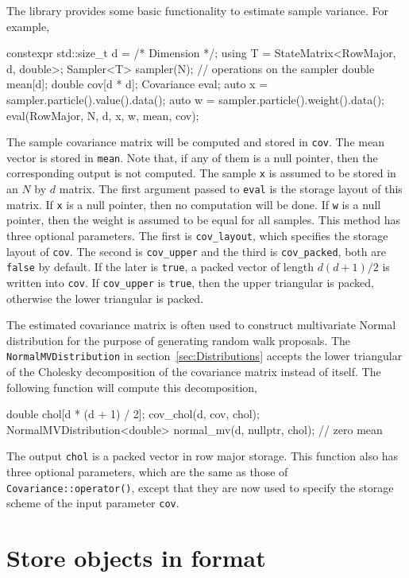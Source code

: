 The library provides some basic functionality to estimate sample variance. For
example,
\begin{cppcode}
  constexpr std::size_t d = /* Dimension */;
  using T = StateMatrix<RowMajor, d, double>;
  Sampler<T> sampler(N);
  // operations on the sampler
  double mean[d];
  double cov[d * d];
  Covariance eval;
  auto x = sampler.particle().value().data();
  auto w = sampler.particle().weight().data();
  eval(RowMajor, N, d, x, w, mean, cov);
\end{cppcode}
The sample covariance matrix will be computed and stored in \verb|cov|. The
mean vector is stored in \verb|mean|. Note that, if any of them is a null
pointer, then the corresponding output is not computed. The sample \verb|x| is
assumed to be stored in an $N$ by $d$ matrix. The first argument passed to
\verb|eval| is the storage layout of this matrix. If \verb|x| is a null
pointer, then no computation will be done. If \verb|w| is a null pointer, then
the weight is assumed to be equal for all samples. This method has three
optional parameters. The first is \verb|cov_layout|, which specifies the
storage layout of \verb|cov|. The second is \verb|cov_upper| and the third is
\verb|cov_packed|, both are \verb|false| by default. If the later is
\verb|true|, a packed vector of length $d(d+1)/2$ is written into
\verb|cov|. If \verb|cov_upper| is \verb|true|, then the upper triangular is
packed, otherwise the lower triangular is packed.

The estimated covariance matrix is often used to construct multivariate Normal
distribution for the purpose of generating random walk proposals. The
\verb|NormalMVDistribution| in section~\ref{sec:Distributions} accepts the
lower triangular of the Cholesky decomposition of the covariance matrix instead
of itself. The following function will compute this decomposition,
\begin{cppcode}
  double chol[d * (d + 1) / 2];
  cov_chol(d, cov, chol);
  NormalMVDistribution<double> normal_mv(d, nullptr, chol); // zero mean
\end{cppcode}
The output \verb|chol| is a packed vector in row major storage. This function
also has three optional parameters, which are the same as those of
\verb|Covariance::operator()|, except that they are now used to specify the
storage scheme of the input parameter \verb|cov|.

\section{Store objects in \protect\hdf format}
\label{sec:Store objects in HDF5 format}

